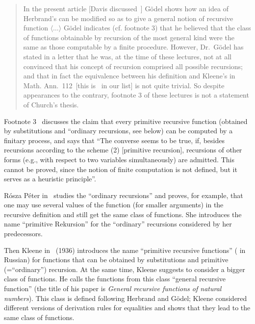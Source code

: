 \documentclass[12pt]{article}
\theoremstyle{remark}
\begin{document}
\begin{quote}
In the present article [Davis discussed~\cite{Godel1934}] G\"odel shows how an idea of Herbrand's can be modified so as to give a general notion of recursive function $\langle\ldots\rangle$ G\"odel indicates (cf. footnote 3) that he believed that the class of functions obtainable by recursion of the most general kind were the same as those computable by a finite procedure. However, Dr.~G\"{o}del has stated in a letter that he was, at the time of these lectures, not at all convinced that his concept of recursion comprised all possible recursions; and that in fact the equivalence between his definition and Kleene's in Math. Ann.~112~[this is~\cite{Kleene1936} in our list] is not quite trivial. So despite appearances to the contrary, footnote 3 of these lectures is not a statement of Church's thesis.
\end{quote}
Footnote 3~\cite[p.~44]{Davis1965} discusses the claim that every primitive recursive function (obtained by substitutions and ``ordinary recursions, see below) can be computed by a finitary process, and says that ``The converse seems to be true, if, besides recursions according to the scheme (2) [primitive recursion], recursions of other forms (e.g., with respect to two variables simultaneously) are admitted. This cannot be proved, since the notion of finite computation is not defined, but it serves as a heuristic principle''.

R\'{o}sza P\'{e}ter in~\cite{Peter1934} studies the ``ordinary recursions'' and proves, for example, that one may use several values of the function (for smaller arguments) in the recursive definition and still get the same class of functions. She introduces the name ``primitive Rekursion'' for the ``ordinary'' recursions considered by her predecessors.

Then Kleene in~\cite{Kleene1936}  (1936) introduces the name ``primitive recursive functions'' ( in Russian) for functions that can be obtained by substitutions and primitive (=``ordinary'') recursion. At the same time, Kleene suggests to consider a bigger class of functions. He calls the functions from this class ``general recursive function'' (the title of his paper is \emph{General recursive functions of natural numbers}). This class is defined following Herbrand and G\"{o}del; Kleene considered different versions of derivation rules for equalities and shows that they lead to the same class of functions.
\end{document}
